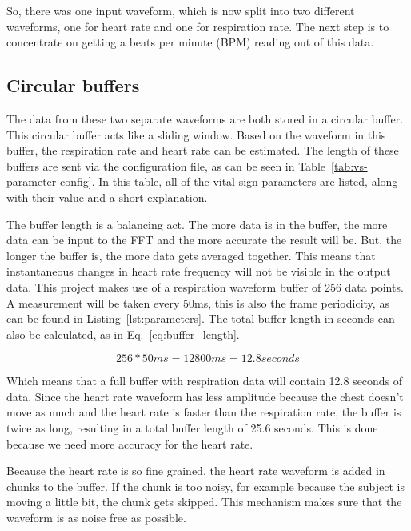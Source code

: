 So, there was one input waveform, which is now split into two different waveforms, one for heart rate and one for respiration rate. The next step is to concentrate on getting a beats per minute (BPM) reading out of this data.

\subsection{Circular buffers}
\label{sec:circular_buffers}
The data from these two separate waveforms are both stored in a circular buffer. This circular buffer acts like a sliding window. Based on the waveform in this buffer, the respiration rate and heart rate can be estimated. The length of these buffers are sent via the configuration file, as can be seen in Table~\ref{tab:vs-parameter-config}. In this table, all of the vital sign parameters are listed, along with their value and a short explanation.

The buffer length is a balancing act. The more data is in the buffer, the more data can be input to the FFT and the more accurate the result will be. But, the longer the buffer is, the more data gets averaged together. This means that instantaneous changes in heart rate frequency will not be visible in the output data. This project makes use of a respiration waveform buffer of 256 data points. A measurement will be taken every 50ms, this is also the frame periodicity, as can be found in Listing~\ref{lst:parameters}. The total buffer length in seconds can also be calculated, as in Eq.~\ref{eq:buffer_length}.

\begin{equation}
\label{eq:buffer_length}
    256 * 50{ms} = 12800{ms} = 12.8 {seconds}
\end{equation}

Which means that a full buffer with respiration data will contain 12.8 seconds of data. Since the heart rate waveform has less amplitude because the chest doesn't move as much and the heart rate is faster than the respiration rate, the buffer is twice as long, resulting in a total buffer length of 25.6 seconds. This is done because we need more accuracy for the heart rate.

Because the heart rate is so fine grained, the heart rate waveform is added in chunks to the buffer. If the chunk is too noisy, for example because the subject is moving a little bit, the chunk gets skipped. This mechanism makes sure that the waveform is as noise free as possible.

